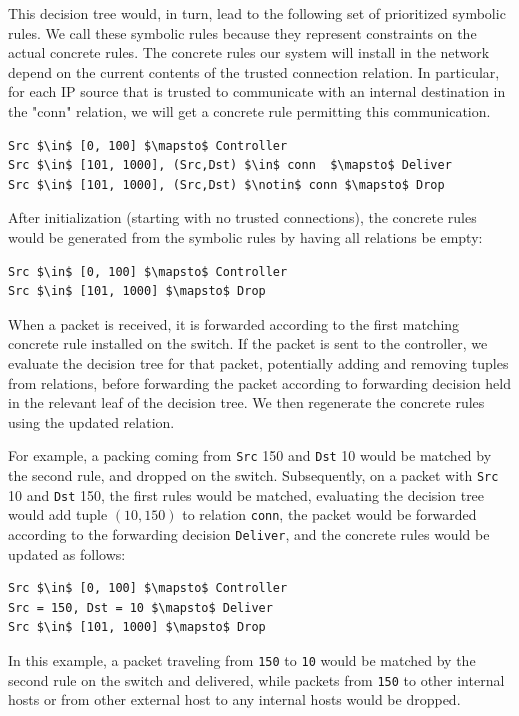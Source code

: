 \documentclass[nocopyrightspace]{sigplanconf}
\begin{document}
This decision tree would, in turn, lead to the following set of prioritized symbolic rules. We call these symbolic rules because they represent constraints on the actual concrete rules. The concrete rules our system will install in the network depend on the current contents of the trusted connection relation. In particular, for each IP source that is trusted to communicate with an internal destination in the "conn" relation, we will get a concrete rule permitting this communication.
  \begin{lstlisting}[mathescape]
Src $\in$ [0, 100] $\mapsto$ Controller
Src $\in$ [101, 1000], (Src,Dst) $\in$ conn  $\mapsto$ Deliver
Src $\in$ [101, 1000], (Src,Dst) $\notin$ conn $\mapsto$ Drop
  \end{lstlisting}

After initialization (starting with no trusted connections), the concrete rules would be generated from the symbolic rules by having all relations be empty:
\begin{lstlisting}[mathescape]
Src $\in$ [0, 100] $\mapsto$ Controller  
Src $\in$ [101, 1000] $\mapsto$ Drop  
\end{lstlisting}
  

  When a packet is received, it is forwarded according to the first matching concrete rule installed on the switch. If the packet is sent to the controller, we evaluate the decision tree for that packet, potentially adding and removing tuples from relations, before forwarding the packet according to forwarding decision held in the relevant leaf of the decision tree. We then regenerate the concrete rules using the updated relation.
  
  For example, a packing coming from \lstinline|Src| 150 and \lstinline|Dst| 10 would be matched by the second rule, and dropped on the switch.
Subsequently, on a packet with \lstinline|Src| 10 and \lstinline|Dst| 150, the first rules would be matched, evaluating the decision tree would add tuple $(10,150)$ to relation \lstinline|conn|, the packet would be forwarded according to the forwarding decision \lstinline|Deliver|, and the concrete rules would be updated as follows:

\begin{lstlisting}[mathescape]
Src $\in$ [0, 100] $\mapsto$ Controller  
Src = 150, Dst = 10 $\mapsto$ Deliver  
Src $\in$ [101, 1000] $\mapsto$ Drop  
\end{lstlisting}
  
In this example, a packet traveling from \lstinline|150| to \lstinline|10| would be matched by the second rule on the switch and delivered, while packets from \lstinline|150| to other internal hosts or from other external host to any internal hosts would be dropped.
\end{document}
